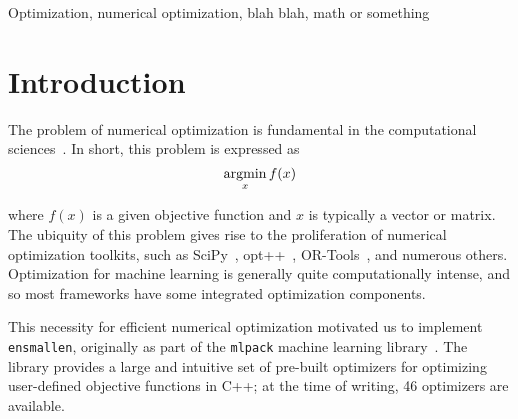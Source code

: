 \documentclass[twoside,11pt]{article}
\begin{document}
\begin{keywords}
  Optimization, numerical optimization, blah blah, math or something
\end{keywords}

\section{Introduction}
\label{sec:introduction}

The problem of numerical optimization is fundamental in the computational
sciences~\citep{Nocedal_2006}.  In short, this problem is expressed as
%
\begin{equation}
\operatornamewithlimits{argmin}_x f(x)
\end{equation}

\noindent
where $f(x)$ is a given objective function and $x$ is typically a vector or matrix.
The ubiquity of this problem gives rise to the proliferation of numerical
optimization toolkits, such as SciPy~\citep{2019arXiv190710121V},
opt++~\citep{meza1994opt++},
OR-Tools~\citep{ortools}, and numerous others.
Optimization for machine learning is generally quite computationally
intense, and so most frameworks have some integrated optimization
components.%


This necessity for efficient numerical optimization
motivated us to implement {\tt ensmallen}, originally as part of the
{\tt mlpack} machine learning library~\citep{mlpack2018}.
The library provides a large and intuitive {set of pre-built optimizers} for
optimizing
{user-defined objective functions} in C++;
at the time of writing, 46 optimizers are available.
\end{document}

